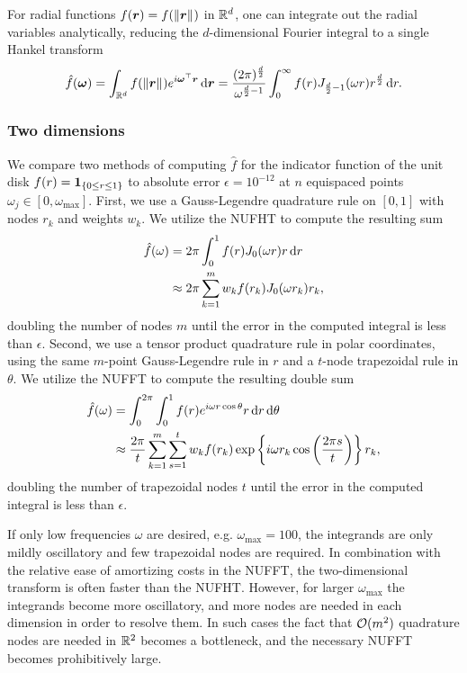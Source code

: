 For radial functions $f(\bm{r}) = f(\left\Vert\bm{r}\right\Vert_{})$ in $\mathbb{R}^d$, one can integrate
out the radial variables analytically, reducing the $d$-dimensional Fourier
integral to a single Hankel transform
\begin{align} \label{eq:radial-fourier}
    \hat{f}(\bm{\omega}) 
    = \int_{\R^d} f(\norm{\bm{r}}) e^{i\bm{\omega}^\top \bm{r}} \dif{\bm{r}}
    = \frac{(2\pi)^{\frac{d}{2}}}{\omega^{\frac{d}{2} - 1}} \int_0^\infty f(r) J_{\frac{d}{2} - 1}(\omega r) r^{\frac{d}{2}} \dif{r}.
\end{align}

\subsubsection{Two dimensions}

We compare two methods of computing $\hat{f}$ for the indicator function of the
unit disk $f(r) = \bm{1}_{\left\{ 0 \leq r \leq 1\right\}}$ to absolute error $\epsilon = 10^{-12}$
at $n$ equispaced points $\omega_j \in [0, \omega_{\text{max}}]$. First, we use
a Gauss-Legendre quadrature rule on $[0,1]$ with nodes $r_k$ and weights $w_k$.
We utilize the NUFHT to compute the resulting sum
\begin{align}
  \hat{f}(\omega) 
  &= 2\pi\int_0^1 f(r) J_0(\omega r) r \mathop{}\!\mathrm{d}{r} \\
  &\approx 2\pi \sum_{k=1}^m w_k f(r_k) J_0(\omega r_k) r_k,
\end{align}
doubling the number of nodes $m$ until the error in the computed integral is
less than $\epsilon$. Second, we use a tensor product quadrature rule in polar
coordinates, using the same $m$-point Gauss-Legendre rule in $r$ and a $t$-node
trapezoidal rule in $\theta$. We utilize the NUFFT to compute the resulting
double sum
\begin{align}
  \hat{f}(\omega) 
  &= \int_0^{2\pi} \int_0^1 f(r) e^{i\omega r\cos\theta} r \mathop{}\!\mathrm{d}{r} \mathop{}\!\mathrm{d}{\theta} \\
  &\approx \frac{2\pi}{t} \sum_{k=1}^{m} \sum_{s=1}^{t} w_k f(r_k) \exp\left\{i\omega r_k\cos\left(\frac{2\pi s}{t}\right)\right\} r_k,
\end{align}
doubling the number of trapezoidal nodes $t$ until the error in the computed
integral is less than $\epsilon$.

If only low frequencies $\omega$ are desired, e.g. $\omega_{\text{max}} = 100$,
the integrands are only mildly oscillatory and few trapezoidal nodes are
required. In combination with the relative ease of amortizing costs in the
NUFFT, the two-dimensional transform is often faster than the NUFHT. However,
for larger $\omega_{\text{max}}$ the integrands become more oscillatory, and
more nodes are needed in each dimension in order to resolve them. In such cases
the fact that $\mathcal{O}(m^2)$ quadrature nodes are needed in $\mathbb{R}^2$ becomes a
bottleneck, and the necessary NUFFT becomes prohibitively large. 

